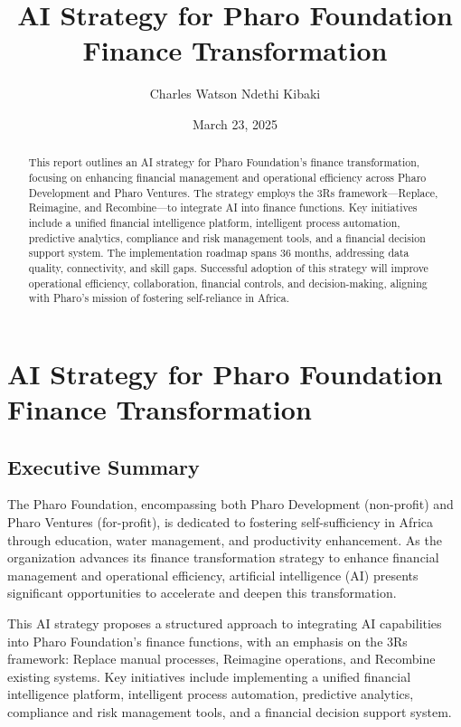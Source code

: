 \documentclass[
]{article}
\title{AI Strategy for Pharo Foundation Finance Transformation}
\author{Charles Watson Ndethi Kibaki}
\date{March 23, 2025}
\begin{document}
\maketitle
\begin{abstract}
This report outlines an AI strategy for Pharo Foundation's finance
transformation, focusing on enhancing financial management and
operational efficiency across Pharo Development and Pharo Ventures. The
strategy employs the 3Rs framework---Replace, Reimagine, and
Recombine---to integrate AI into finance functions. Key initiatives
include a unified financial intelligence platform, intelligent process
automation, predictive analytics, compliance and risk management tools,
and a financial decision support system. The implementation roadmap
spans 36 months, addressing data quality, connectivity, and skill gaps.
Successful adoption of this strategy will improve operational
efficiency, collaboration, financial controls, and decision-making,
aligning with Pharo's mission of fostering self-reliance in Africa.
\end{abstract}


\section{AI Strategy for Pharo Foundation Finance
Transformation}\label{ai-strategy-for-pharo-foundation-finance-transformation}

\subsection{Executive Summary}\label{executive-summary}

The Pharo Foundation, encompassing both Pharo Development (non-profit)
and Pharo Ventures (for-profit), is dedicated to fostering
self-sufficiency in Africa through education, water management, and
productivity enhancement. As the organization advances its finance
transformation strategy to enhance financial management and operational
efficiency, artificial intelligence (AI) presents significant
opportunities to accelerate and deepen this transformation.

This AI strategy proposes a structured approach to integrating AI
capabilities into Pharo Foundation's finance functions, with an emphasis
on the 3Rs framework: Replace manual processes, Reimagine operations,
and Recombine existing systems. Key initiatives include implementing a
unified financial intelligence platform, intelligent process automation,
predictive analytics, compliance and risk management tools, and a
financial decision support system.
\end{document}
